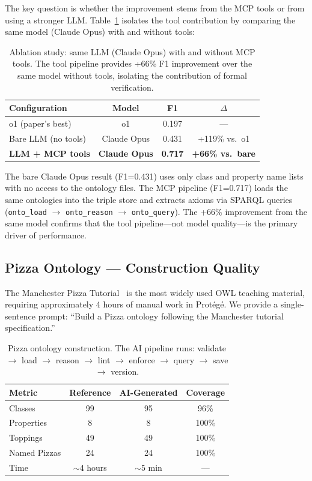 \documentclass[runningheads]{llncs}
\begin{document}
The key question is whether the improvement stems from the MCP tools or from using a stronger LLM. Table~\ref{tab:ablation} isolates the tool contribution by comparing the same model (Claude Opus) with and without tools:

\begin{table}[t]
\centering
\caption{Ablation study: same LLM (Claude Opus) with and without MCP tools. The tool pipeline provides +66\% F1 improvement over the same model without tools, isolating the contribution of formal verification.}
\label{tab:ablation}
\begin{tabular}{@{}lccc@{}}
\toprule
\textbf{Configuration} & \textbf{Model} & \textbf{F1} & \textbf{$\Delta$} \\
\midrule
o1 (paper's best) & o1 & 0.197 & --- \\
Bare LLM (no tools) & Claude Opus & 0.431 & +119\% vs.\ o1 \\
\textbf{LLM + MCP tools} & \textbf{Claude Opus} & \textbf{0.717} & \textbf{+66\% vs.\ bare} \\
\bottomrule
\end{tabular}
\end{table}

The bare Claude Opus result (F1=0.431) uses only class and property name lists with no access to the ontology files. The MCP pipeline (F1=0.717) loads the same ontologies into the triple store and extracts axioms via SPARQL queries (\texttt{onto\_load} $\to$ \texttt{onto\_reason} $\to$ \texttt{onto\_query}). The +66\% improvement from the same model confirms that the tool pipeline---not model quality---is the primary driver of performance.

\subsection{Pizza Ontology — Construction Quality}

The Manchester Pizza Tutorial~\cite{pizza} is the most widely used OWL teaching material, requiring approximately 4 hours of manual work in Prot\'eg\'e. We provide a single-sentence prompt: ``Build a Pizza ontology following the Manchester tutorial specification.''

\begin{table}[t]
\centering
\caption{Pizza ontology construction. The AI pipeline runs: validate $\to$ load $\to$ reason $\to$ lint $\to$ enforce $\to$ query $\to$ save $\to$ version.}
\label{tab:pizza}
\begin{tabular}{@{}lccc@{}}
\toprule
\textbf{Metric} & \textbf{Reference} & \textbf{AI-Generated} & \textbf{Coverage} \\
\midrule
Classes & 99 & 95 & 96\% \\
Properties & 8 & 8 & 100\% \\
Toppings & 49 & 49 & 100\% \\
Named Pizzas & 24 & 24 & 100\% \\
Time & $\sim$4 hours & $\sim$5 min & --- \\
\bottomrule
\end{tabular}
\end{table}
\end{document}

